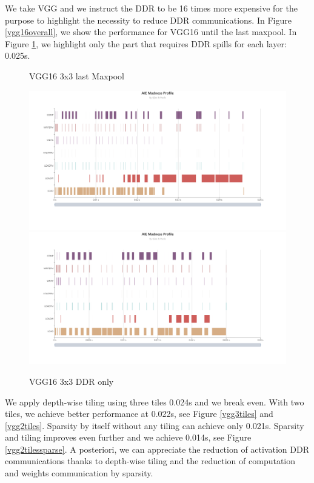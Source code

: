 \documentclass[conference]{IEEEtran}
\begin{document}
We take VGG and we instruct the DDR to be 16 times more expensive for
the purpose to highlight the necessity to reduce DDR communications.
In Figure \ref{vgg16overall}, we show the performance for VGG16 until
the last maxpool. In Figure \ref{vggddronly}, we highlight only the
part that requires DDR spills for each layer: 0.025s.
\begin{figure}[htb]
\centering 
\caption{VGG16 3x3 last Maxpool}
\includegraphics[width=0.99\linewidth]{vgg16overall.png}
\label{vgg16overall}
\includegraphics[width=1.2\linewidth,angle=90]{vggddronly.png}
\caption{VGG16 3x3 DDR only}
\label{vggddronly}
\end{figure}
We apply depth-wise tiling using three tiles 0.024s and we break
even. With two tiles, we achieve better performance at 0.022s, see
Figure \ref{vgg3tiles} and \ref{vgg2tiles}. Sparsity by itself without
any tiling can achieve only 0.021s. Sparsity and tiling improves even
further and we achieve 0.014s, see Figure \ref{vgg2tilessparse}. A
posteriori, we can appreciate the reduction of activation DDR
communications thanks to depth-wise tiling and the reduction of
computation and weights communication by sparsity. 
\end{document}
